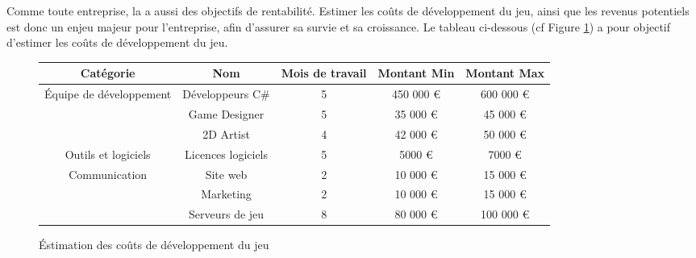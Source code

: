 Comme toute entreprise, la \textit{\companyName} a aussi des objectifs de rentabilité.
Estimer les co\^uts de développement du jeu, ainsi que les revenus potentiels est donc un enjeu majeur pour l'entreprise, afin d'assurer sa survie et sa croissance.
Le tableau ci-dessous (cf Figure \ref*{fig:couts_de_dev}) a pour objectif d'estimer les co\^uts de développement du jeu.
\\

\begin{figure}[H]
    \centering
    \begin{tabular}{|c|c|c|c|c|}
        \hline
        Cat\'egorie & Nom & Mois de travail & Montant Min & Montant Max \\
        \hline
        \multirow{3}{*}{\'Equipe de d\'eveloppement} & Développeurs C\# & 5 & 450 000 \euro  & 600 000 \euro \\
        \cline{2-5}
        & Game Designer & 5 & 35 000 \euro & 45 000 \euro \\
        \cline{2-5}
        & 2D Artist & 4 & 42 000 \euro & 50 000 \euro \\
        \hline
        Outils et logiciels & Licences logiciels & 5 & 5000 \euro & 7000 \euro \\
        \hline
        \multirow{2}{*}{Communication} & Site web & 2 & 10 000 \euro & 15 000 \euro \\
        \cline{2-5}
        & Marketing & 2 & 10 000 \euro & 15 000 \euro \\
        \hline
         & Serveurs de jeu & 8 & 80 000 \euro & 100 000 \euro \\




    \end{tabular}
    \caption{\'Estimation des co\^uts de développement du jeu}
    \label{fig:couts_de_dev}
\end{figure}





